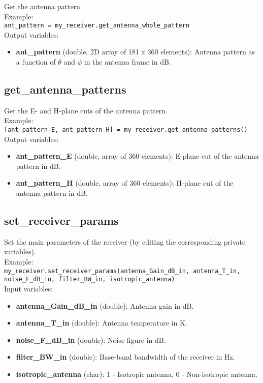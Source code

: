 Get the antenna pattern.\\

Example:\\

\texttt{ant\_pattern = my\_receiver.get\_antenna\_whole\_pattern}\\

Output variables:
\begin{itemize}
\item {\bf ant\_pattern} (double, 2D array of 181 x 360 elements): Antenna pattern as a function of $\theta$ and $\phi$ in the antenna frame in dB.
\end{itemize}


\subsection{get\_antenna\_patterns}

Get the E- and H-plane cuts of the antenna pattern.\\

Example:\\

\texttt{[ant\_pattern\_E, ant\_pattern\_H] = my\_receiver.get\_antenna\_patterns()}\\

Output variables:
\begin{itemize}
\item {\bf ant\_pattern\_E} (double, array of 360 elements): E-plane cut of the antenna pattern in dB.
\item {\bf ant\_pattern\_H} (double, array of 360 elements): H-plane cut of the antenna pattern in dB.
\end{itemize}


\subsection{set\_receiver\_params}

Set the main parameters of the receiver (by editing the corresponding private variables).\\

Example:\\

\texttt{my\_receiver.set\_receiver\_params(antenna\_Gain\_dB\_in, antenna\_T\_in, noise\_F\_dB\_in, filter\_BW\_in, isotropic\_antenna)}\\

Input variables:
\begin{itemize}
\item {\bf antenna\_Gain\_dB\_in} (double): Antenna gain in dB.
\item {\bf antenna\_T\_in} (double): Antenna temperature in K.
\item {\bf noise\_F\_dB\_in} (double): Noise figure in dB.
\item {\bf filter\_BW\_in} (double): Base-band bandwidth of the receiver in Hz.
\item {\bf isotropic\_antenna} (char): 1 - Isotropic antenna, 0 - Non-isotropic antenna.
\end{itemize}


